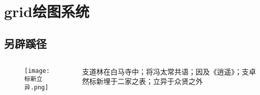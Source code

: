 

\section{grid绘图系统}
\subsection{另辟蹊径}
\begin{frame}{\subsecname}{}
  \begin{columns}
    \begin{column}{.5\textwidth}
      \begin{figure}
        \centering \texttt{[image: 标新立异.png]}
      \end{figure}
    \end{column}

    \begin{column}{.5\textwidth}
      \begin{ornamentblock}
        {支道林在白马寺中；将冯太常共语；因及《逍遥》；支卓然标新埋于二家之表；立异于众贤之外\\
          }
      \end{ornamentblock}
    \end{column}
  \end{columns}
\end{frame}

